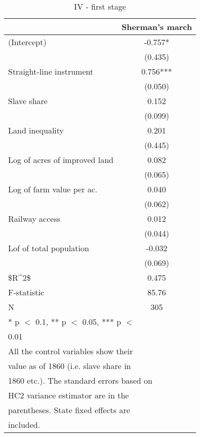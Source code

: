 \begin{table}

\caption{\label{tab:}IV - first stage}
\centering
\begin{tabular}[t]{lc}
\toprule
  & Sherman's march\\
\midrule
(Intercept) & -0.757*\\
 & (0.435)\\
Straight-line instrument & 0.756***\\
 & (0.050)\\
Slave share & 0.152\\
 & (0.099)\\
Land inequality & 0.201\\
 & (0.445)\\
Log of acres of improved land & 0.082\\
 & (0.065)\\
Log of farm value per ac. & 0.040\\
 & (0.062)\\
Railway access & 0.012\\
 & (0.044)\\
Lof of total population & -0.032\\
 & (0.069)\\
\midrule
\$R\textasciicircum{}2\$ & 0.475\\
F-statistic & 85.76\\
N & 305\\
\bottomrule
\multicolumn{2}{l}{\textsuperscript{} * p $<$ 0.1, ** p $<$ 0.05, *** p $<$}\\
\multicolumn{2}{l}{0.01}\\
\multicolumn{2}{l}{\textsuperscript{} All the control variables show their}\\
\multicolumn{2}{l}{value as of 1860 (i.e. slave share in}\\
\multicolumn{2}{l}{1860 etc.). The standard errors based on}\\
\multicolumn{2}{l}{HC2 variance estimator are in the}\\
\multicolumn{2}{l}{parentheses. State fixed effects are}\\
\multicolumn{2}{l}{included.}\\
\end{tabular}
\end{table}
